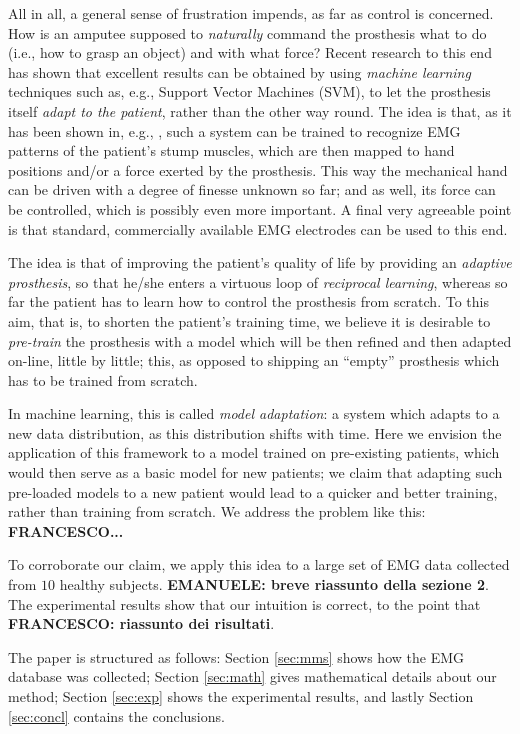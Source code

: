 All in all, a general sense of frustration impends, as far as control
is concerned. How is an amputee supposed to \emph{naturally} command
the prosthesis what to do (i.e., how to grasp an object) and with what
force? Recent research to this end has shown that excellent results
can be obtained by using \emph{machine learning} techniques such as,
e.g., Support Vector Machines (SVM), to let the prosthesis itself
\emph{adapt to the patient}, rather than the other way round. The idea
is that, as it has been shown in, e.g.,
\cite{smagt,dunlop,2008.ICRA,2008.BioCyb,Sebelius2005}, such a system
can be trained to recognize EMG patterns of the patient's stump
muscles, which are then mapped to hand positions and/or a force
exerted by the prosthesis. This way the mechanical hand can be driven
with a degree of finesse unknown so far; and as well, its force can be
controlled, which is possibly even more important. A final very
agreeable point is that standard, commercially available EMG
electrodes can be used to this end.

The idea is that of improving the patient's quality of life by
providing an \emph{adaptive prosthesis}, so that he/she enters a
virtuous loop of \emph{reciprocal learning}, whereas so far the
patient has to learn how to control the prosthesis from scratch. To
this aim, that is, to shorten the patient's training time, we believe it is
desirable to \emph{pre-train} the prosthesis with a model which will
be then refined and then adapted on-line, little by little; this, as
opposed to shipping an ``empty'' prosthesis which has to be trained
from scratch.

In machine learning, this is called \emph{model adaptation}: a system
which adapts to a new data distribution, as this distribution shifts
with time. Here we envision the application of this framework to a
model trained on pre-existing patients, which would then serve as a
basic model for new patients; we claim that adapting such pre-loaded
models to a new patient would lead to a quicker and better training,
rather than training from scratch. We address the problem like this:
\textbf{FRANCESCO...}

To corroborate our claim, we apply this idea to a large set of EMG
data collected from $10$ healthy subjects. \textbf{EMANUELE: breve
riassunto della sezione 2}. The experimental results
show that our intuition is correct, to the point that
\textbf{FRANCESCO: riassunto dei risultati}.

The paper is structured as follows: Section \ref{sec:mms} shows how
the EMG database was collected; Section \ref{sec:math} gives
mathematical details about our method; Section \ref{sec:exp} shows the
experimental results, and lastly Section \ref{sec:concl} contains the
conclusions.
